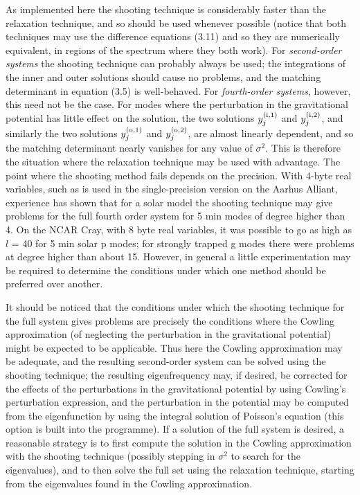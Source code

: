 As implemented here the shooting technique is considerably faster than
the relaxation technique, and so should be used whenever possible
(notice that both techniques may use the difference equations (3.11)
and so they are numerically equivalent, in regions of the spectrum
where they both work). For {\it second-order systems} the shooting technique can
probably always be used; the integrations of the inner and outer solutions
should cause no problems, and the matching determinant in equation (3.5)
is well-behaved. For  {\it fourth-order systems},
however, this need not be the case. For modes where the perturbation
in the gravitational potential has little effect on the solution, the
two solutions $y_j^{\rm (i,1)}$ and $y_j^{\rm (i,2)}$, and similarly the
two solutions $y_j^{\rm (o,1)}$ and $y_j^{\rm (o,2)}$, are almost
linearly dependent, and so the matching determinant nearly vanishes for any
value of $\sigma^2$. This is therefore the situation where the relaxation
technique may be used with advantage. 
The point where the shooting method fails depends on the precision. 
With 4-byte real variables, such as is used in the single-precision
version on the Aarhus Alliant, 
experience has shown that for a solar
model the shooting technique may give problems for the full fourth order
system for 5 min modes of degree higher than 4.
On the NCAR Cray, with 8 byte real variables,
it was possible to go as high as $l$ = 40
for 5 min solar p modes; for strongly
trapped g modes there were problems at degree higher than about 15.
However, in general a little experimentation may be required to
determine the conditions under which one method should be preferred
over another.

It should be noticed that the conditions under which the shooting technique
for the full system gives problems are precisely the conditions where
the Cowling approximation (of neglecting the perturbation in the
gravitational potential) might be expected to be applicable. Thus
here the Cowling approximation may be adequate, and the resulting
second-order system can be solved using the shooting technique; the
resulting eigenfrequency may, if desired, be corrected for the
effects of the perturbations in the gravitational potential by
using Cowling's perturbation expression, and the perturbation
in the potential may be computed from the eigenfunction by using
the integral solution of Poisson's equation (this option is 
built into the programme). If a solution of the
full system is desired, a reasonable strategy is to first compute
the solution in the Cowling approximation with the shooting technique
(possibly stepping in $\sigma^2$ to search for the eigenvalues),
and to then solve the full set using the relaxation technique,
starting from the eigenvalues found in the Cowling approximation.

